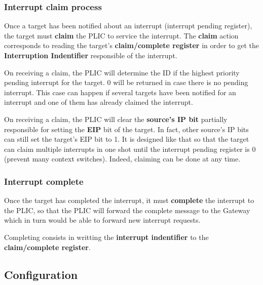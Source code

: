 \documentclass[10pt, a4paper]{article}
\begin{document}
\subsubsection{Interrupt claim process}

Once a target has been notified about an interrupt (interrupt pending register), the target must \textbf{claim} the PLIC to service the interrupt. The \textbf{claim} action corresponds to reading the target's \textbf{claim/complete register} in order to get the \textbf{Interruption Indentifier} responsible of the interrupt.

On receiving a claim, the PLIC will determine the ID if the highest priority pending interrupt for the target. 0 will be returned in case there is no pending interrupt. This case can happen if several targets have been notified for an interrupt and one of them has already claimed the interrupt.

On receiving a claim, the PLIC will clear the \textbf{source's IP bit} partially responsible for setting the \textbf{EIP} bit of the target. In fact, other source's IP bits can still set the target's EIP bit to 1. It is designed like that so that the target can claim multiple interrupts in one shot until the interrupt pending register is 0 (prevent many context switches). Indeed, claiming can be done at any time.\\

\noindent {}

\subsubsection{Interrupt complete}

Once the target has completed the interrupt, it must \textbf{complete} the interrupt to the PLIC, so that the PLIC will forward the complete message to the Gateway which in turn would be able to forward new interrupt requests.

Completing consists in writting the \textbf{interrupt indentifier} to the \textbf{claim/complete register}.\\

\noindent {}

\subsection{Configuration}
\end{document}
